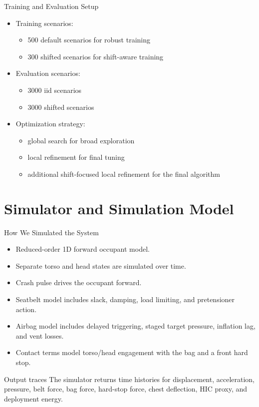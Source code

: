 \documentclass[aspectratio=169]{beamer}
\begin{document}
\begin{frame}{Training and Evaluation Setup}
  \begin{itemize}
    \item Training scenarios:
    \begin{itemize}
      \item 500 default scenarios for robust training
      \item 300 shifted scenarios for shift-aware training
    \end{itemize}
    \item Evaluation scenarios:
    \begin{itemize}
      \item 3000 iid scenarios
      \item 3000 shifted scenarios
    \end{itemize}
    \item Optimization strategy:
    \begin{itemize}
      \item global search for broad exploration
      \item local refinement for final tuning
      \item additional shift-focused local refinement for the final algorithm
    \end{itemize}
  \end{itemize}
\end{frame}

\section{Simulator and Simulation Model}

\begin{frame}{How We Simulated the System}
  \begin{itemize}
    \item Reduced-order 1D forward occupant model.
    \item Separate torso and head states are simulated over time.
    \item Crash pulse drives the occupant forward.
    \item Seatbelt model includes slack, damping, load limiting, and pretensioner action.
    \item Airbag model includes delayed triggering, staged target pressure, inflation lag, and vent losses.
    \item Contact terms model torso/head engagement with the bag and a front hard stop.
  \end{itemize}

  \begin{block}{Output traces}
    The simulator returns time histories for displacement, acceleration, pressure, belt force, bag force, hard-stop force, chest deflection, HIC proxy, and deployment energy.
  \end{block}
\end{frame}
\end{document}
